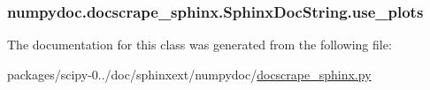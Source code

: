 \subsubsection[{use\+\_\+plots}]{\setlength{\rightskip}{0pt plus 5cm}numpydoc.\+docscrape\+\_\+sphinx.\+Sphinx\+Doc\+String.\+use\+\_\+plots}\label{classnumpydoc_1_1docscrape__sphinx_1_1SphinxDocString_a49bd19755dc2089b58e5b8f9915f3c75}


The documentation for this class was generated from the following file\+:\begin{DoxyCompactItemize}
\item 
packages/scipy-\/0../doc/sphinxext/numpydoc/\hyperlink{docscrape__sphinx_8py}{docscrape\+\_\+sphinx.\+py}\end{DoxyCompactItemize}

